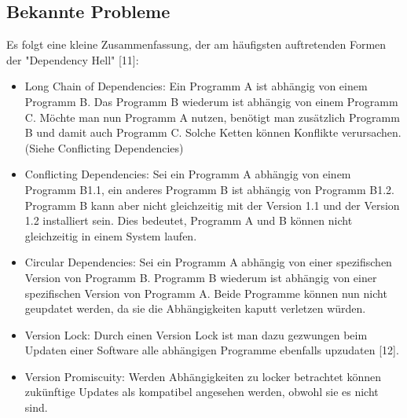 \subsection{Bekannte Probleme}
Es folgt eine kleine Zusammenfassung, der am häufigsten auftretenden Formen der "Dependency Hell" [11]:
\begin{itemize}
 \item Long Chain of Dependencies: Ein Programm A ist abhängig von einem Programm B. Das Programm B wiederum ist abhängig von einem Programm C.
Möchte man nun Programm A nutzen, benötigt man zusätzlich Programm B und damit auch Programm C. Solche Ketten können Konflikte verursachen.
(Siehe Conflicting Dependencies)
\item Conflicting Dependencies: Sei ein Programm A abhängig von einem Programm B1.1, ein anderes Programm B ist abhängig von Programm B1.2. Programm B 
kann aber nicht gleichzeitig mit der Version 1.1 und der Version 1.2 installiert sein. Dies bedeutet, Programm A und B können nicht gleichzeitig in einem System laufen.
\item Circular Dependencies: Sei ein Programm A abhängig von einer spezifischen Version von Programm B. Programm B wiederum ist abhängig von einer spezifischen
Version von Programm A. Beide Programme können nun nicht geupdatet werden, da sie die Abhängigkeiten kaputt verletzen würden.
\item Version Lock: Durch einen Version Lock ist man dazu gezwungen beim Updaten einer Software alle abhängigen Programme ebenfalls upzudaten [12].
\item Version Promiscuity: Werden Abhängigkeiten zu locker betrachtet können zukünftige Updates als kompatibel angesehen werden, obwohl sie es nicht sind.
\end{itemize}


